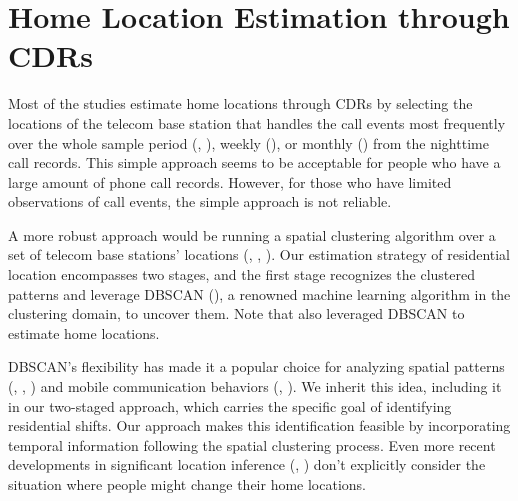 \section{Home Location Estimation through CDRs}\label{sec:2_home_location_estimation_through_cdrs}

Most of the studies estimate home locations through CDRs by selecting the locations of the telecom base station that handles the call events most frequently over the whole sample period (\cite{cho2011friendship}, \cite{phithakkitnukoon2012socio}), weekly (\cite{referral_effect_2023aer}), or monthly (\cite{phithakkitnukoon2022inferring}) from the nighttime call records.
This simple approach seems to be acceptable for people who have a large amount of phone call records. However, for those who have limited observations of call events, the simple approach is not reliable.

A more robust approach would be running a spatial clustering algorithm over a set of telecom base stations' locations (\cite{isaacman2011identifying}, \cite{yang2014identifying}, \cite{ayesha2019user}).
Our estimation strategy of residential location encompasses two stages, and the first stage recognizes the clustered patterns and leverage DBSCAN (\cite{ester1996density}), a renowned machine learning algorithm in the clustering domain, to uncover them. Note that \cite{ayesha2019user} also leveraged DBSCAN to estimate home locations.


DBSCAN's flexibility has made it a popular choice for analyzing spatial patterns (\cite{yang2014identifying}, \cite{shi2014density}, \cite{dominguez2017sensing}) and mobile communication behaviors (\cite{karahoca2006comparing}, \cite{jabbar2020fraud}).
We inherit this idea, including it in our two-staged approach, which carries the specific goal of identifying residential shifts.
Our approach makes this identification feasible by incorporating temporal information following the spatial clustering process.
Even more recent developments in significant location inference (\cite{tongsinoot2017exploring}, \cite{luo2020research}) don't explicitly consider the situation where people might change their home locations.


